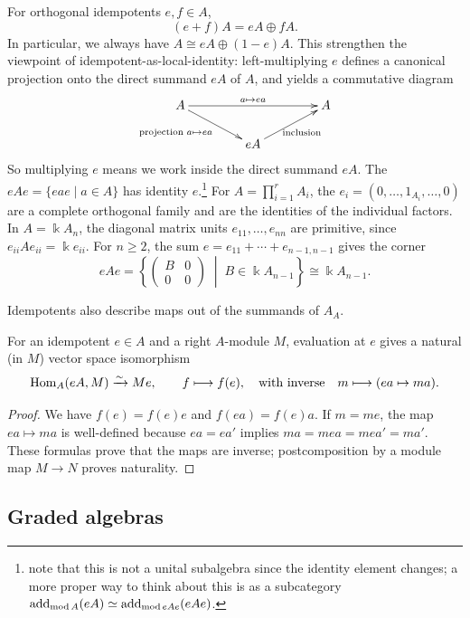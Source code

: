 \begin{remark}\label{rem:idempotent-units}
For orthogonal idempotents $e,f\in A$,
\[
(e+f)A=eA\oplus fA.
\]
In particular, we always have $A\cong eA\oplus (1-e)A$.  
This strengthen the viewpoint of idempotent-as-local-identity: left-multiplying $e$ defines a canonical projection onto the direct summand $eA$ of $A$, and yields a commutative diagram
\[
\xymatrix@C=42pt@R=18pt{
A \ar[rr]^{a\mapsto ea} \ar[dr]_{\text{projection }a\mapsto ea\qquad} && A\\
& eA \ar[ur]_{\text{inclusion}} &
}
\]
So multiplying $e$ means we work inside the direct summand $eA$.
The  $eAe=\{eae\mid a\in A\}$ has identity $e$.\footnote{note that this is not a unital subalgebra since the identity element changes; a more proper way to think about this is as a subcategory $\operatorname{add}_{\operatorname{\mathrm{mod}} A}(eA)\simeq \operatorname{add}_{\operatorname{\mathrm{mod}} eAe}(eAe)$.}
For $A=\prod_{i=1}^r A_i$, the  $e_i=(0,\ldots,1_{A_i},\ldots,0)$ are a complete orthogonal family and are the identities of the individual factors.
In $A=\Bbbk A_n$, the diagonal matrix units $e_{11},\ldots,e_{nn}$ are primitive, since $e_{ii}Ae_{ii}=\Bbbk e_{ii}$.
For $n\geq2$, the sum $e=e_{11}+\cdots+e_{n-1,n-1}$ gives the corner
\[
eAe=\left\{\begin{pmatrix}B&0\\0&0\end{pmatrix}\;\middle|\;B\in\Bbbk A_{n-1}\right\}
\cong\Bbbk A_{n-1}.
\]
\end{remark}

Idempotents also describe maps out of the summands of $A_A$.
\begin{lemma}\label{lem:idempotent-hom}
For an idempotent $e\in A$ and a right $A$-module $M$, evaluation at $e$ gives a natural (in $M$) vector space isomorphism
\[
\operatorname{Hom}\nolimits_A(eA,M)\xrightarrow{\sim}Me,\qquad f\longmapsto f(e),
\quad\text{with inverse}\quad m\longmapsto(ea\mapsto ma).
\]
\end{lemma}
\begin{proof}
We have $f(e)=f(e)e$ and $f(ea)=f(e)a$.
If $m=me$, the map $ea\mapsto ma$ is well-defined because $ea=ea'$ implies $ma=mea=mea'=ma'$.
These formulas prove that the maps are inverse; postcomposition by a module map $M\to N$ proves naturality.
\end{proof}




\subsection{Graded algebras}

